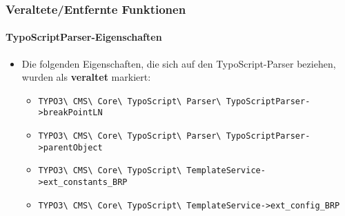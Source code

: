 %

\begin{frame}[fragile]
	\frametitle{Veraltete/Entfernte Funktionen}
	\framesubtitle{TypoScriptParser-Eigenschaften}

	\begin{itemize}
		\item Die folgenden Eigenschaften, die sich auf den TypoScript-Parser beziehen,
			wurden als \textbf{veraltet} markiert:
			\vspace{0.2cm}
			\begin{itemize}\smaller
				\item \texttt{TYPO3\textbackslash
					CMS\textbackslash
					Core\textbackslash
					TypoScript\textbackslash
					Parser\textbackslash
					TypoScriptParser->breakPointLN}
				\item \texttt{TYPO3\textbackslash
					CMS\textbackslash
					Core\textbackslash
					TypoScript\textbackslash
					Parser\textbackslash
					TypoScriptParser->parentObject}
				\item \texttt{TYPO3\textbackslash
					CMS\textbackslash
					Core\textbackslash
					TypoScript\textbackslash
					TemplateService->ext\_constants\_BRP}
				\item \texttt{TYPO3\textbackslash
					CMS\textbackslash
					Core\textbackslash
					TypoScript\textbackslash
					TemplateService->ext\_config\_BRP}
			\end{itemize}

	\end{itemize}

\end{frame}


